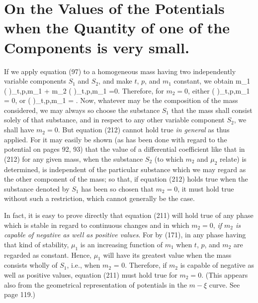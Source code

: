\documentclass[12pt]{memoir}
\begin{document}
\section{On the Values of the Potentials when the Quantity of one of the Components is very small.}
If we apply equation (97) to a homogeneous mass having two independently variable components $S_1$ and $S_2$, and make $t$, $p$, and $m_1$ constant, we obtain
\eqs m_1 \left(  \right)_{t,p,m_1} + m_2 \left(  \right)_{t,p,m_1} =0. \label{210}\eqe
Therefore, for $m_2 = 0$, either
\eqs \left(  \right)_{t,p,m_1} = 0,  \label{211}\eqe
or    \eqs  \left(  \right)_{t,p,m_1} = \infty . \label{212}\eqe
Now, whatever may be the composition of the mass considered, we may always so choose the substance $S_1$ that the mass shall consist solely of that substance, and in respect to any other variable component $S_2$, we shall have $m_2=0$. But equation (212) cannot hold true \textit{in general} as thus applied. For it may easily be shown (as has been done with regard to the potential on pages 92, 93) that the value of a differential coefficient like that in (212) for any given mass, when the substance $S_2$ (to which $m_2$ and $\mu_2$ relate) is determined, is independent of the particular substance which we may regard as the other component of the mass; so that, if equation (212) holds true when the substance denoted by $S_1$ has been so chosen that $m_2=0$, it must hold true without such a restriction, which cannot generally be the case.


In fact, it is easy to prove directly that equation (211) will hold true of any phase which is stable in regard to continuous changes and in which $m_2 = 0$, \textit{if $m_2$ is capable of negative as well as positive values}. For by (171), in any phase having that kind of stability, $\mu_1$ is an increasing function of $m_1$ when $t$, $p$, and $m_2$ are regarded as constant. Hence, $\mu_1$ will have its greatest value when the mass consists wholly of $S_1$, i.e., when $m_2$ = 0. Therefore, if $m_2$ is capable of negative as well as positive values, equation (211) must hold true for $m_2=0$. (This appears also from the geometrical representation of potentials in the $m\!-\xi$ curve. See page 119.)
\end{document}
